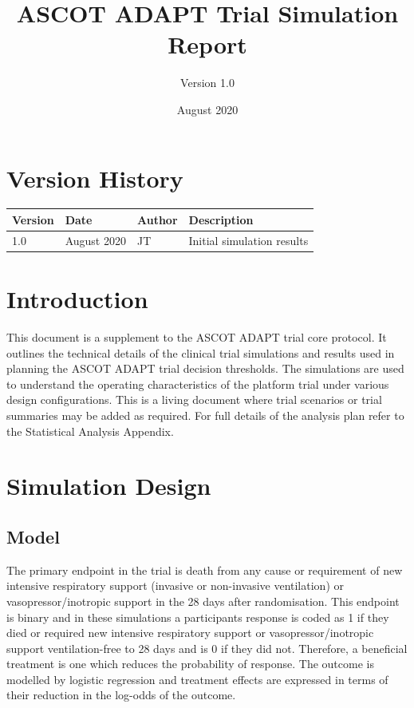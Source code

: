 \documentclass[
]{article}
\title{ASCOT ADAPT Trial Simulation Report}
\subtitle{Version 1.0}
\author{}
\date{\vspace{-2.5em}August 2020}
\begin{document}
\maketitle

{
\setcounter{tocdepth}{2}
\tableofcontents
}
\hypertarget{version-history}{%
\section*{Version History}\label{version-history}}

\begin{center}
    \begin{tabular}{lllp{5cm}}
    \hline
    Version & Date & Author & Description \\ \hline
    1.0 & August 2020 & JT & Initial simulation results \\ 
    \hline
    \end{tabular}
\end{center}

\clearpage

\hypertarget{introduction}{%
\section{Introduction}\label{introduction}}

This document is a supplement to the ASCOT ADAPT trial core protocol.
It outlines the technical details of the clinical trial simulations and results used in planning the ASCOT ADAPT trial decision thresholds.
The simulations are used to understand the operating characteristics of the platform trial under various design configurations.
This is a living document where trial scenarios or trial summaries may be added as required.
For full details of the analysis plan refer to the Statistical Analysis Appendix.

\clearpage

\hypertarget{simulation-design}{%
\section{Simulation Design}\label{simulation-design}}

\hypertarget{model}{%
\subsection{Model}\label{model}}

The primary endpoint in the trial is death from any cause or requirement of new intensive respiratory support (invasive or non-invasive ventilation) or vasopressor/inotropic support in the 28 days after randomisation.
This endpoint is binary and in these simulations a participants response is coded as 1 if they died or required new intensive respiratory support or vasopressor/inotropic support ventilation-free to 28 days and is 0 if they did not.
Therefore, a beneficial treatment is one which reduces the probability of response.
The outcome is modelled by logistic regression and treatment effects are expressed in terms of their reduction in the log-odds of the outcome.
\end{document}
